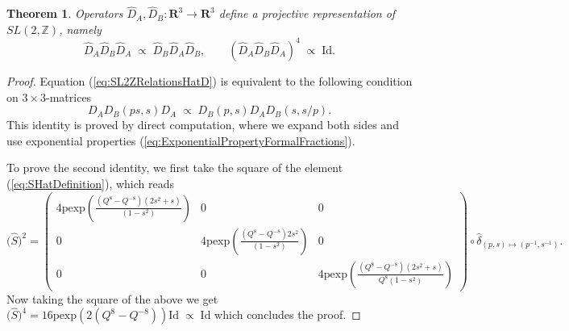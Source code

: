 \documentclass{amsart}
\newtheorem{theorem}{Theorem}
\begin{document}
\begin{theorem}
    Operators $\widehat D_A,\widehat D_B:\mathbf R^3\rightarrow\mathbf R^3$ define a projective representation of $SL(2,\mathbb Z)$, namely
    \begin{equation}
    \widehat D_A\widehat D_B\widehat D_A\;\propto\; \widehat D_B\widehat D_A\widehat D_B,\qquad \left(\widehat D_A\widehat D_B\widehat D_A\right)^4\;\propto\;\mathrm{Id}.
    \label{eq:SL2ZRelationsHatD}
    \end{equation}
\label{th:SL2ZRelationsHatD}
\end{theorem}
\begin{proof}
Equation (\ref{eq:SL2ZRelationsHatD}) is equivalent to the following condition on $3\times 3$-matrices
\begin{equation*}
D_A D_B(ps,s) D_A\;\propto\; D_B(p,s) D_A D_B(s,s/p).
\label{eq:usefulrelation}
\end{equation*}
This identity is proved by direct computation, where we expand both sides and use exponential properties (\ref{eq:ExponentialPropertyFormalFractions}).

To prove the second identity, we first take the square of the element (\ref{eq:SHatDefinition}), which reads
\begin{equation}
\Big(\widehat S\Big)^2=\left(\begin{array}{ccc}
 4 \textrm{pexp}\left(\frac{\left(Q^8-Q^{-8}\right) (2 s^2+s)}{\left(1-s^2\right)}\right) & 0 & 0 \\
 0 & 4 \textrm{pexp}\left(\frac{\left(Q^8-Q^{-8}\right) 2s^2}{\left(1-s^2\right)}\right) & 0 \\
 0 & 0 & 4 \textrm{pexp}\left(\frac{\left(Q^8-Q^{-8}\right) (2 s^2+s)}{Q^8 \left(1-s^2\right)}\right)
\end{array}\right)\circ\widehat\delta_{(p,s)\mapsto(p^{-1},s^{-1})}.
\label{eq:SHat2Explicit}
\end{equation}
Now taking the square of the above we get $\big(\widehat S\big)^4=16\mathrm{pexp}\left(2(Q^8-Q^{-8})\right)\mathrm{Id}\;\propto\;\mathrm{Id}$ which concludes the proof.
\end{proof}
\end{document}

